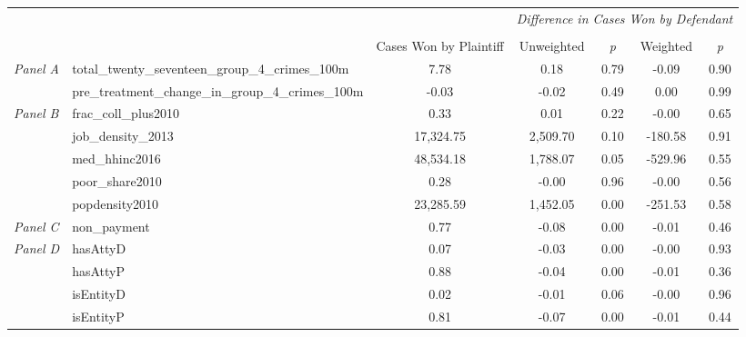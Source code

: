\begin{tabular}{llccccc}
\toprule
 &  & \textit{} & \multicolumn{4}{c}{\textit{Difference in Cases Won by Defendant}} \\
\cline{4-7}
\\
 &  & Cases Won by Plaintiff & Unweighted & \emph{p} & Weighted & \emph{p} \\
\midrule
\multirow[c]{2}{3cm}{\textit{Panel A}} & total_twenty_seventeen_group_4_crimes_100m & 7.78 & 0.18 & 0.79 & -0.09 & 0.90 \\
 & pre_treatment_change_in_group_4_crimes_100m & -0.03 & -0.02 & 0.49 & 0.00 & 0.99 \\
\cline{1-7}
\multirow[c]{5}{3cm}{\textit{Panel B}} & frac_coll_plus2010 & 0.33 & 0.01 & 0.22 & -0.00 & 0.65 \\
 & job_density_2013 & 17,324.75 & 2,509.70 & 0.10 & -180.58 & 0.91 \\
 & med_hhinc2016 & 48,534.18 & 1,788.07 & 0.05 & -529.96 & 0.55 \\
 & poor_share2010 & 0.28 & -0.00 & 0.96 & -0.00 & 0.56 \\
 & popdensity2010 & 23,285.59 & 1,452.05 & 0.00 & -251.53 & 0.58 \\
\cline{1-7}
\textit{Panel C} & non_payment & 0.77 & -0.08 & 0.00 & -0.01 & 0.46 \\
\cline{1-7}
\multirow[c]{4}{3cm}{\textit{Panel D}} & hasAttyD & 0.07 & -0.03 & 0.00 & -0.00 & 0.93 \\
 & hasAttyP & 0.88 & -0.04 & 0.00 & -0.01 & 0.36 \\
 & isEntityD & 0.02 & -0.01 & 0.06 & -0.00 & 0.96 \\
 & isEntityP & 0.81 & -0.07 & 0.00 & -0.01 & 0.44 \\
\cline{1-7}
\bottomrule
\end{tabular}
